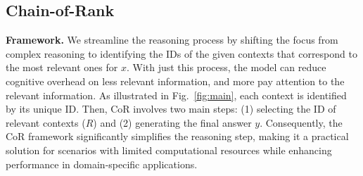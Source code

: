 



\subsection{Chain-of-Rank} 

\noindent\textbf{Framework.}
We streamline the reasoning process by shifting the focus from complex reasoning to identifying the IDs of the given contexts that correspond to the most relevant ones for $x$. With just this process, the model can reduce cognitive overhead on less relevant information, and more pay attention to the relevant information. As illustrated in Fig.~\ref{fig:main}, each context is identified by its unique ID. Then, CoR involves two main steps: (1) selecting the ID of relevant contexts (\ie $R$) and (2) generating the final answer $y$.
Consequently, the CoR framework significantly simplifies the reasoning step, making it a practical solution for scenarios with limited computational resources while enhancing performance in domain-specific applications.

